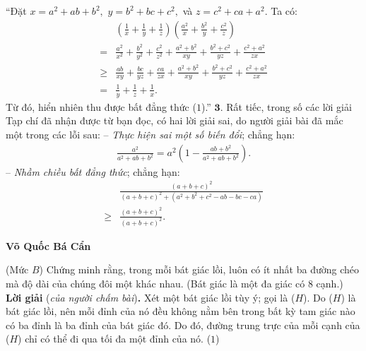 \begin{multicols}{2}
	\vskip 0.05cm
	“Đặt $x = {a^2} + ab + {b^2},$ $y = {b^2} + bc + {c^2},$      và $z = {c^2} + ca + {a^2}$.  Ta có:
	\begin{align*}
		&\left( {\frac{1}{x} + \frac{1}{y} + \frac{1}{z}} \right)\left( {\frac{{{a^2}}}{x} + \frac{{{b^2}}}{y} + \frac{{{c^2}}}{z}} \right)\\
		= &\frac{{{a^2}}}{{{x^2}}} \!+\! \frac{{{b^2}}}{{{y^2}}} \!+\! \frac{{{c^2}}}{{{z^2}}} \!+\! \frac{{{a^2} \!+\! {b^2}}}{{xy}} \!+\! \frac{{{b^2} \!+\! {c^2}}}{{yz}} \!+\! \frac{{{c^2} \!+\! {a^2}}}{{zx}}\\
		\ge &\frac{{ab}}{{xy}} \!+\! \frac{{bc}}{{yz}} \!+\! \frac{{ca}}{{zx}} \!+\! \frac{{{a^2} \!+\! {b^2}}}{{xy}} \!+\! \frac{{{b^2} \!+\! {c^2}}}{{yz}} \!+\! \frac{{{c^2}\! +\! {a^2}}}{{zx}}\\
		= &\frac{1}{y} + \frac{1}{z} + \frac{1}{x}.
	\end{align*}
	Từ đó, hiển nhiên thu được bất đẳng thức ($1$).”
	\vskip 0.05cm
	$\pmb{3.}$ Rất tiếc, trong số các lời giải Tạp chí đã nhận được từ bạn đọc, có hai lời giải sai, do người giải bài đã mắc một trong các lỗi sau:
	\vskip 0.05cm
	-- \textit{Thực hiện sai một số biến đổi}; chẳng hạn:
	\begin{align*}
		\frac{{{a^2}}}{{{a^2} + ab + {b^2}}} = {a^2}\left( {1 - \frac{{ab + {b^2}}}{{{a^2} + ab + {b^2}}}} \right).
	\end{align*}
	-- \textit{Nhầm chiều bất đẳng thức}; chẳng hạn:
	\begin{align*}
		&\frac{{{{\left( {a + b + c} \right)}^2}}}{{{{\left( {a \!+\! b \!+\! c} \right)}^2} \!+\! \left( {{a^2} \!+\! {b^2} \!+\! {c^2} \!-\! ab \!-\! bc \!-\! ca} \right)}} \\
		\ge &\frac{{{{\left( {a + b + c} \right)}^2}}}{{{{\left( {a + b + c} \right)}^2}}}.
	\end{align*}
	\begin{flushright}
		\textbf{\color{thachthuctoanhoc}Võ Quốc Bá Cẩn}
	\end{flushright}
	{}
	(Mức $B$)
	Chứng minh rằng, trong mỗi bát giác lồi, luôn có ít nhất ba đường chéo mà độ dài của chúng đôi một khác nhau.
	(Bát giác là một đa giác có $8$ cạnh.)
	\vskip 0.05cm
	\textbf{\color{thachthuctoanhoc}Lời giải} (\textit{của người chấm bài})\textbf{\color{thachthuctoanhoc}.}
	\vskip 0.05cm
	Xét một bát giác lồi tùy ý; gọi là ($H$).
	\vskip 0.05cm
	Do ($H$) là bát giác lồi, nên mỗi đỉnh của nó đều không nằm bên trong bất kỳ tam giác nào có ba đỉnh là ba đỉnh của bát giác đó. Do đó, đường trung trực của mỗi cạnh của ($H$) chỉ có thể đi qua tối đa một đỉnh của nó. \hfill ($1$)

\end{multicols}
